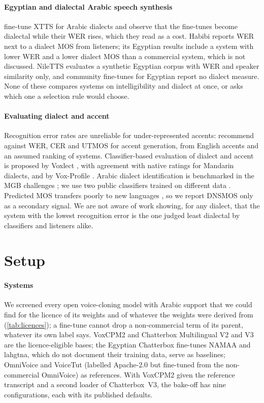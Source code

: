 \documentclass[11pt]{article}
\newcommand{\vox}{VoxCPM2\xspace}
\newcommand{\cbthree}{Chatterbox~V3\xspace}
\begin{document}
\paragraph{Egyptian and dialectal Arabic speech synthesis}
\citet{doan2024arabicdialects} fine-tune XTTS for Arabic dialects and observe that the fine-tunes become dialectal while
their WER rises, which they read as a cost. Habibi \citep{chen2026habibi} reports WER next to a dialect MOS from
listeners; its Egyptian results include a system with lower WER and a lower dialect MOS than a commercial system, which
is not discussed. NileTTS \citep{khamis2026niletts} evaluates a synthetic Egyptian corpus with WER and speaker similarity
only, and community fine-tunes for Egyptian \citep{namaa2026egyptiantts,oddadmix2026lahgtna} report no dialect measure.
None of these compares systems on intelligibility and dialect at once, or asks which one a selection rule would choose.

\paragraph{Evaluating dialect and accent}
Recognition error rates are unreliable for under-represented accents: \citet{zhong2025accent} recommend against WER, CER
and UTMOS for accent generation, from English accents and an assumed ranking of systems. Classifier-based evaluation of
dialect and accent is proposed by Voxlect \citep{feng2025voxlect}, with agreement with native ratings for Mandarin
dialects, and by Vox-Profile \citep{feng2025voxprofile}. Arabic dialect identification is benchmarked in the MGB
challenges \citep{ali2017mgb3,ali2019mgb5}; we use two public classifiers trained on different data
\citep{abdullah2025adivc,ibrahimamin2025hubertadi}. Predicted MOS transfers poorly to new languages
\citep{kunesova2024zeroshotmos}, so we report DNSMOS \citep{reddy2021dnsmos} only as a secondary signal. We are not aware
of work showing, for any dialect, that the system with the lowest recognition error is the one judged least dialectal by
classifiers and listeners alike.

\section{Setup}\label{sec:setup}
\paragraph{Systems}
We screened every open voice-cloning model with Arabic support that we could find for the licence of its weights and of
whatever the weights were derived from (\cref{tab:licences}); a fine-tune cannot drop a non-commercial term of its parent,
whatever its own label says. \vox and Chatterbox Multilingual V2 and V3 are the licence-eligible bases; the Egyptian
Chatterbox fine-tunes NAMAA and lahgtna, which do not document their training data, serve as baselines; OmniVoice and
VoiceTut (labelled Apache-2.0 but fine-tuned from the non-commercial OmniVoice) as references. With \vox given the
reference transcript and a second loader of \cbthree, the bake-off has nine configurations, each with its published
defaults.
\end{document}
